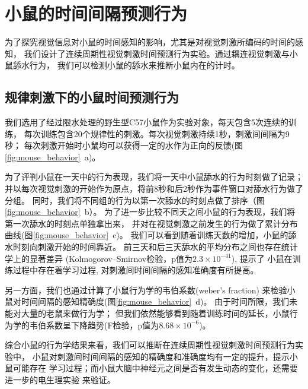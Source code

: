 
\section{小鼠的时间间隔预测行为}
为了探究视觉信息对小鼠的时间感知的影响，尤其是对视觉刺激所编码的时间的感知，
我们设计了连续周期性视觉刺激时间预测行为实验。通过耦连视觉刺激与小鼠舔水行为，
我们可以检测小鼠的舔水来推断小鼠内在的计时。

\subsection{规律刺激下的小鼠时间预测行为}
我们选用了经过限水处理的野生型C57小鼠作为实验对象，每天包含5次连续的训练，
每次训练包含20个规律性的刺激。每次视觉刺激持续1秒，刺激间间隔为9秒；
每次刺激开始时小鼠均可以获得一定的水作为正向的反馈(图\ref{fig:mouse_behavior}~a)。

为了评判小鼠在一天中的行为表现，我们将一天中小鼠舔水的行为时刻做了记录；
并以每次视觉刺激的开始作为原点，将前8秒和后2秒作为事件窗口对舔水行为做了分组。
同时，我们将不同组的行为以第一次舔水的时刻点做了排序（图\ref{fig:mouse_behavior}~b）。
为了进一步比较不同天之间小鼠的行为表现，我们将第一次舔水的时刻点单独拿出来，
并对在视觉刺激之前发生的行为做了累计分布曲线(图\ref{fig:mouse_behavior}~c)。
我们可以看到随着训练天数的增加，小鼠的舔水时刻向刺激开始的时间靠近。
前三天和后三天舔水的平均分布之间也存在统计学上的显著差异
(Kolmogorov–Smirnov检验，p值为$2.3 \times 10 ^ {-41}$), 提示了
小鼠在训练过程中存在着学习过程, 对刺激间时间间隔的感知准确度有所提高。

另一方面，我们也通过计算了小鼠行为学的韦伯系数(weber's fraction)
来检验小鼠对时间间隔的感知精确度(图\ref{fig:mouse_behavior}~d)。
由于时间所限，我们未能对大量的老鼠来做行为学；
但我们依然能够看到随着训练时间的延长，小鼠行为学的韦伯系数呈下降趋势(F检验，p值为\(8.68\times 10^{-6}\))。

综合小鼠的行为学结果来看，我们可以推断在连续周期性视觉刺激时间预测行为实验中，
小鼠对刺激间时间间隔的感知的精确度和准确度均有一定的提升，提示小鼠可能存在
学习过程；而小鼠大脑中神经元之间是否有发生动态的变化，还需要进一步的电生理实验
来验证。

